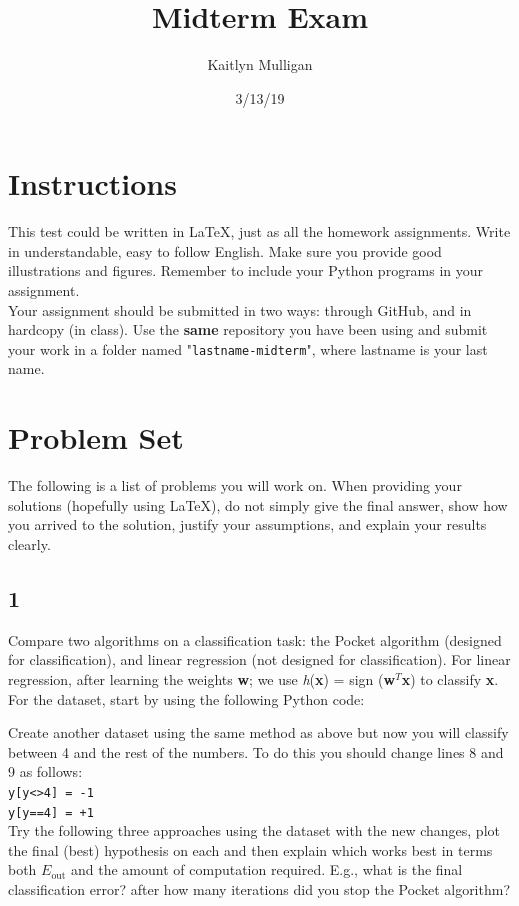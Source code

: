 \documentclass[a4paper]{article}
\title{Midterm Exam}
\author{Kaitlyn Mulligan}
\date{3/13/19}
\newcommand\tab[1][0.5cm]{\hspace*{#1}}
\begin{document}
\lstset{language=Python}

\maketitle

\section{Instructions}
This test could be written in \LaTeX, just as all the homework assignments.  Write in 
understandable, easy to follow English.  Make sure you provide good illustrations and 
figures.  Remember to include your Python programs in your assignment.\\
\tab Your assignment should be submitted in two ways: through GitHub, and in hardcopy (in 
class).  Use the \textbf{same} repository you have been using and submit your work in a 
folder named "\verb|lastname-midterm|", where lastname is your last name.


\section{Problem Set}
The following is a list of problems you will work on.  When providing your solutions (hopefully 
using \LaTeX), do not simply give the final answer, show how you arrived to the solution, justify 
your assumptions, and explain your results clearly.


\subsection{1} Compare two algorithms on a classification task: the Pocket algorithm (designed 
for classification), and linear regression (not designed for classification).  For linear 
regression, after learning the weights \textbf{w}; we use \textit{h}(\textbf{x}) = sign
(\textbf{w}$^T$\textbf{x}) to classify \textbf{x}.  For the dataset, start by using the following 
Python code:

Create another dataset using the same method as above but now you will classify between 4 and the 
rest of the numbers.  To do this you should change lines 8 and 9 as follows:\\
\verb|y[y<>4] = -1|\\
\verb|y[y==4] = +1|\\
Try the following three approaches using the dataset with the new changes, plot the final (best) 
hypothesis on each and then explain which works best in terms both $E_{\text{out}}$ and the 
amount of computation required.  E.g., what is the final classification error?  after how many 
iterations did you stop the Pocket algorithm?\\
\end{document}
